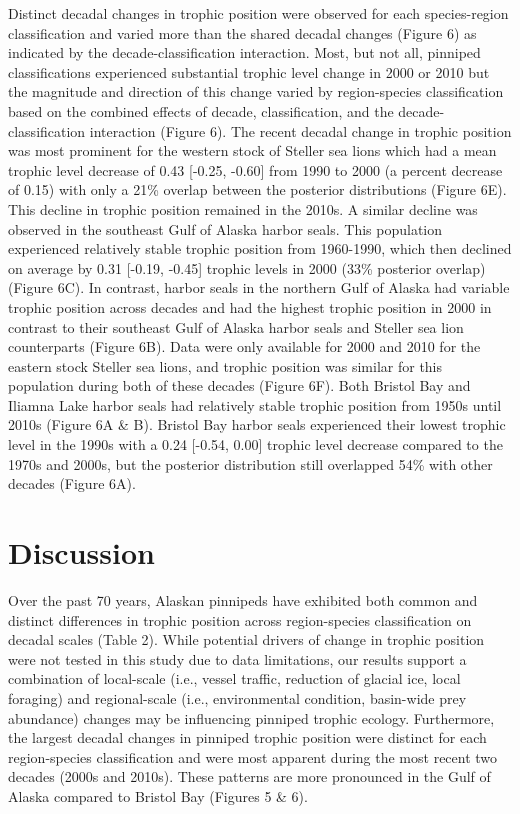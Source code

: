 \documentclass [11pt, proquest] {uwthesis}[2015/03/03]
\begin{document}
Distinct decadal changes in trophic position were observed for each
species-region classification and varied more than the shared decadal
changes (Figure 6) as indicated by the decade-classification
interaction. Most, but not all, pinniped classifications experienced
substantial trophic level change in 2000 or 2010 but the magnitude and
direction of this change varied by region-species classification based
on the combined effects of decade, classification, and the
decade-classification interaction (Figure 6). The recent decadal change
in trophic position was most prominent for the western stock of Steller
sea lions which had a mean trophic level decrease of 0.43 {[}-0.25,
-0.60{]} from 1990 to 2000 (a percent decrease of 0.15) with only a 21\%
overlap between the posterior distributions (Figure 6E). This decline in
trophic position remained in the 2010s. A similar decline was observed
in the southeast Gulf of Alaska harbor seals. This population
experienced relatively stable trophic position from 1960-1990, which
then declined on average by 0.31 {[}-0.19, -0.45{]} trophic levels in
2000 (33\% posterior overlap) (Figure 6C). In contrast, harbor seals in
the northern Gulf of Alaska had variable trophic position across decades
and had the highest trophic position in 2000 in contrast to their
southeast Gulf of Alaska harbor seals and Steller sea lion counterparts
(Figure 6B). Data were only available for 2000 and 2010 for the eastern
stock Steller sea lions, and trophic position was similar for this
population during both of these decades (Figure 6F). Both Bristol Bay
and Iliamna Lake harbor seals had relatively stable trophic position
from 1950s until 2010s (Figure 6A \& B). Bristol Bay harbor seals
experienced their lowest trophic level in the 1990s with a 0.24
{[}-0.54, 0.00{]} trophic level decrease compared to the 1970s and
2000s, but the posterior distribution still overlapped 54\% with other
decades (Figure 6A).

\section{Discussion}\label{discussion-2}

Over the past 70 years, Alaskan pinnipeds have exhibited both common and
distinct differences in trophic position across region-species
classification on decadal scales (Table 2). While potential drivers of
change in trophic position were not tested in this study due to data
limitations, our results support a combination of local-scale (i.e.,
vessel traffic, reduction of glacial ice, local foraging) and
regional-scale (i.e., environmental condition, basin-wide prey
abundance) changes may be influencing pinniped trophic ecology.
Furthermore, the largest decadal changes in pinniped trophic position
were distinct for each region-species classification and were most
apparent during the most recent two decades (2000s and 2010s). These
patterns are more pronounced in the Gulf of Alaska compared to Bristol
Bay (Figures 5 \& 6).
\end{document}
